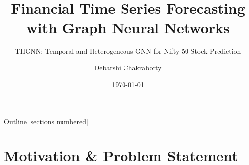 \documentclass[aspectratio=169, 10pt]{beamer}
\title{Financial Time Series Forecasting\\with Graph Neural Networks}
\subtitle{THGNN: Temporal and Heterogeneous GNN for Nifty 50 Stock Prediction}
\author{Debarshi Chakraborty}
\date{\today}
\institute{Financial Time Series Forecasting Project}
\begin{document}
\maketitle

\begin{frame}{Outline}
  [sections numbered]
  \tableofcontents[hideallsubsections]
\end{frame}

\section{Motivation \& Problem Statement}
\end{document}
